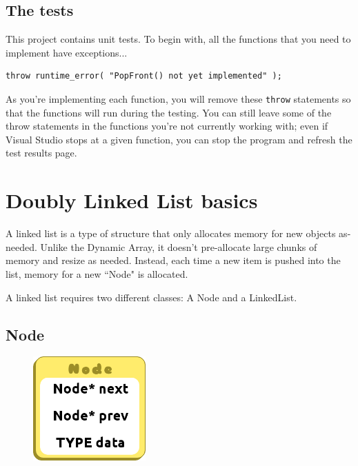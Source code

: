 \documentclass[a4paper,12pt,oneside]{book}
\begin{document}
    \section{The tests}

    This project contains unit tests. To begin with, all the functions
    that you need to implement have exceptions...

\begin{lstlisting}[style=code]
throw runtime_error( "PopFront() not yet implemented" );
\end{lstlisting}

    As you're implementing each function, you will remove these
    \texttt{throw} statements so that the functions will run during the testing.
    You can still leave some of the throw statements in the functions
    you're not currently working with; even if Visual Studio stops at
    a given function, you can stop the program and refresh the test results page.


    \tableofcontents

    \newpage
    \chapter{Doubly Linked List basics}

        A linked list is a type of structure that only allocates memory for new objects as-needed.
        Unlike the Dynamic Array, it doesn't pre-allocate large chunks of memory and resize as 
        needed. Instead, each time a new item is pushed into the list, memory for a new ``Node" 
        is allocated.

        A linked list requires two different classes: A Node and a LinkedList.

    \section{Node}
        
        \begin{figure}
        \includegraphics[height=4cm]{images/justanode.png}
        \end{figure}
    
\end{document}
